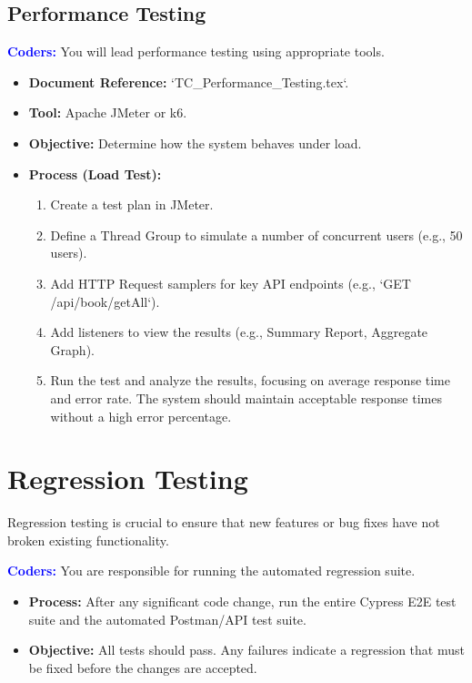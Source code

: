 \documentclass{article}
\newcommand{\role}[1]{\textbf{\textcolor{blue}{#1:}}}
\begin{document}
\subsection{Performance Testing}
\role{Coders}
You will lead performance testing using appropriate tools.
\begin{itemize}
    \item \textbf{Document Reference:} `TC\_Performance\_Testing.tex`.
    \item \textbf{Tool:} Apache JMeter or k6.
    \item \textbf{Objective:} Determine how the system behaves under load.
    \item \textbf{Process (Load Test):}
    \begin{enumerate}
        \item Create a test plan in JMeter.
        \item Define a Thread Group to simulate a number of concurrent users (e.g., 50 users).
        \item Add HTTP Request samplers for key API endpoints (e.g., `GET /api/book/getAll`).
        \item Add listeners to view the results (e.g., Summary Report, Aggregate Graph).
        \item Run the test and analyze the results, focusing on average response time and error rate. The system should maintain acceptable response times without a high error percentage.
    \end{enumerate}
\end{itemize}

\section{Regression Testing}
Regression testing is crucial to ensure that new features or bug fixes have not broken existing functionality.

\role{Coders}
You are responsible for running the automated regression suite.
\begin{itemize}
    \item \textbf{Process:} After any significant code change, run the entire Cypress E2E test suite and the automated Postman/API test suite.
    \item \textbf{Objective:} All tests should pass. Any failures indicate a regression that must be fixed before the changes are accepted.
\end{itemize}
\end{document}
